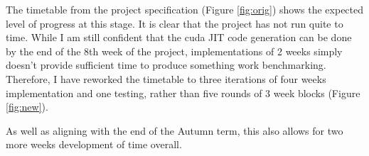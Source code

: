 \documentclass[11pt]{article}
\begin{document}
The timetable from the project specification (Figure \ref{fig:orig}) shows the expected level of progress at this stage. It is clear that the project has not run quite to time. While I am still confident that the cuda JIT code generation can be done by the end of the 8th week of the project, implementations of 2 weeks simply doesn't provide sufficient time to produce something work benchmarking. Therefore, I have reworked the timetable to three iterations of four weeks implementation and one testing, rather than five rounds of 3 week blocks (Figure \ref{fig:new}).
\par As well as aligning with the end of the Autumn term, this also allows for two more weeks development of time overall.

\begin{figure}[h!]
\centering
{}
\end{figure}
\end{document}
